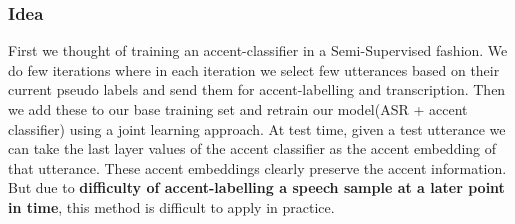 \documentclass[12pt, a4paper, twoside]{article}
\begin{document}
\subsubsection{Idea}
First we thought of training an accent-classifier in a Semi-Supervised fashion. We do few iterations where in each iteration we select few utterances based on their current pseudo labels and send them for accent-labelling and transcription. Then we add these to our base training set and retrain our model(ASR + accent classifier) using a joint learning approach. At test time, given a test utterance we can take the last layer values of the accent classifier as the accent embedding of that utterance.
These accent embeddings clearly preserve the accent information. But due to \textbf{difficulty of accent-labelling a speech sample at a later point in time},
this method is difficult to apply in practice.
\end{document}
